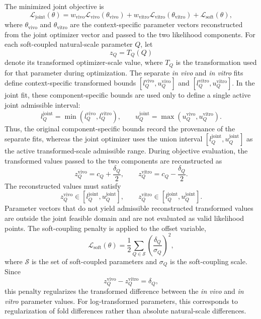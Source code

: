 \documentclass[11pt]{article}
\begin{document}
The minimized joint objective is
\begin{equation}
\mathcal L_{\mathrm{joint}}(\theta) = w_{\mathrm{vivo}}\mathcal L_{\mathrm{vivo}}(\theta_{\mathrm{vivo}}) + w_{\mathrm{vitro}}\mathcal L_{\mathrm{vitro}}(\theta_{\mathrm{vitro}}) + \mathcal L_{\mathrm{soft}}(\theta),
\label{eq:appendix_joint_objective}
\end{equation}
where $\theta_{\mathrm{vivo}}$ and $\theta_{\mathrm{vitro}}$ are the context-specific parameter vectors reconstructed from the joint optimizer vector and passed to the two likelihood components. 
For each soft-coupled natural-scale parameter $Q$, let
\[
z_Q=T_Q(Q)
\]
denote its transformed optimizer-scale value, where $T_Q$ is the transformation used for that parameter during optimization. The separate \textit{in vivo} and \textit{in vitro} fits define context-specific transformed bounds $[l_Q^{\mathrm{vivo}},u_Q^{\mathrm{vivo}}]$ and $[l_Q^{\mathrm{vitro}},u_Q^{\mathrm{vitro}}]$. In the joint fit, these component-specific bounds are used only to define a single active joint admissible interval:
\begin{equation}
l_Q^{\mathrm{joint}} = \min\!\left(l_Q^{\mathrm{vivo}},l_Q^{\mathrm{vitro}}\right), \qquad u_Q^{\mathrm{joint}} = \max\!\left(u_Q^{\mathrm{vivo}},u_Q^{\mathrm{vitro}}\right).
\label{eq:appendix_joint_union_bounds}
\end{equation}
Thus, the original component-specific bounds record the provenance of the separate fits, whereas the joint optimizer uses the union interval $[l_Q^{\mathrm{joint}},u_Q^{\mathrm{joint}}]$ as the active transformed-scale admissible range.
During objective evaluation, the transformed values passed to the two components are reconstructed as
\begin{equation}
z^{\mathrm{vivo}}_Q = c_Q+\frac{\delta_Q}{2}, \qquad z^{\mathrm{vitro}}_Q = c_Q-\frac{\delta_Q}{2}.
\label{eq:appendix_joint_center_delta_split}
\end{equation}
The reconstructed values must satisfy
\begin{equation}
z_Q^{\mathrm{vivo}}\in [l_Q^{\mathrm{joint}},u_Q^{\mathrm{joint}}], \qquad z_Q^{\mathrm{vitro}}\in [l_Q^{\mathrm{joint}},u_Q^{\mathrm{joint}}].
\label{eq:appendix_joint_reconstructed_bounds}
\end{equation}
Parameter vectors that do not yield admissible reconstructed transformed values are outside the joint feasible domain and are not evaluated as valid likelihood points.
The soft-coupling penalty is applied to the offset variable,
\begin{equation}
\mathcal L_{\mathrm{soft}}(\theta) = \frac{1}{2} \sum_{Q\in\mathcal S} \left(\frac{\delta_Q}{\sigma_Q}\right)^2,
\label{eq:appendix_joint_soft_penalty}
\end{equation}
where $\mathcal S$ is the set of soft-coupled parameters and $\sigma_Q$ is the soft-coupling scale. Since
\[
z_Q^{\mathrm{vivo}}-z_Q^{\mathrm{vitro}}=\delta_Q,
\]
this penalty regularizes the transformed difference between the \textit{in vivo} and \textit{in vitro} parameter values. For log-transformed parameters, this corresponds to regularization of fold differences rather than absolute natural-scale differences.
\end{document}
